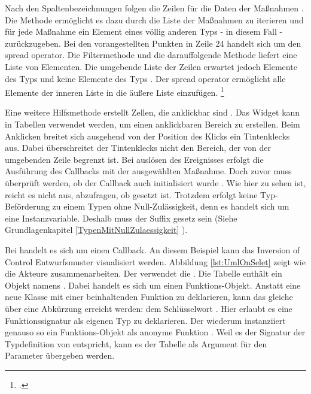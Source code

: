 Nach den Spaltenbezeichnungen folgen die Zeilen für die Daten der Maßnahmen .
Die Methode   ermöglicht es dazu durch die Liste der Maßnahmen zu iterieren und für jede Maßnahme ein Element eines völlig anderen Typs - in diesem Fall  - zurückzugeben.
Bei den vorangestellten Punkten  in Zeile 24 handelt sich um den spread operator. Die Filtermethode  und die darauffolgende Methode  liefert eine Liste von  Elementen. Die umgebende Liste der Zeilen   erwartet jedoch Elemente des Typs  und keine Elemente des Typs . Der spread operator ermöglicht alle Elemente der inneren Liste in die äußere Liste einzufügen. \footcite[Vgl.][]{SpreadOperator}

Eine weitere Hilfsmethode  erstellt Zellen, die anklickbar sind .
Das Widget   kann in Tabellen verwendet werden, um einen anklickbaren Bereich zu erstellen.
Beim  Anklicken breitet sich ausgehend von der Position des Klicks ein Tintenklecks  aus.
Dabei überschreitet der Tintenklecks nicht den Bereich, der von der umgebenden Zeile begrenzt ist.
Bei auslösen des Ereignisses  erfolgt die Ausführung des Callbacks   mit der ausgewählten Maßnahme.
Doch zuvor muss überprüft werden, ob der Callback auch initialisiert wurde .
Wie hier zu sehen ist, reicht es nicht aus, abzufragen, ob   gesetzt ist.
Trotzdem erfolgt keine Typ-Beförderung zu einem Typen ohne Null-Zulässigkeit, denn es handelt sich um eine Instanzvariable.
Deshalb muss der Suffix \IC{!} gesetz sein (Siehe Grundlagenkapitel \ref{TypenMitNullZulaessigkeit} ).

Bei  handelt es sich um einen Callback.
An diesem Beispiel kann das Inversion of Control Entwurfsmuster visualisiert werden.
Abbildung \ref{lst:UmlOnSelet} zeigt wie die Akteure zusammenarbeiten.
Der  verwendet die .
Die Tabelle enthält ein Objekt namens .
Dabei handelt es sich um einen Funktions-Objekt.
Anstatt eine neue Klasse mit einer beinhaltenden Funktion zu deklarieren, kann das gleiche über eine Abkürzung erreicht werden: dem Schlüsselwort  .
Hier erlaubt es eine Funktionssignatur als eigenen Typ zu deklarieren.
Der  wiederum instanziiert genauso so ein Funktions-Objekt als anonyme Funktion .
Weil es der Signatur der Typdefinition von   entspricht, kann es der Tabelle als Argument für den Parameter  übergeben werden. 

